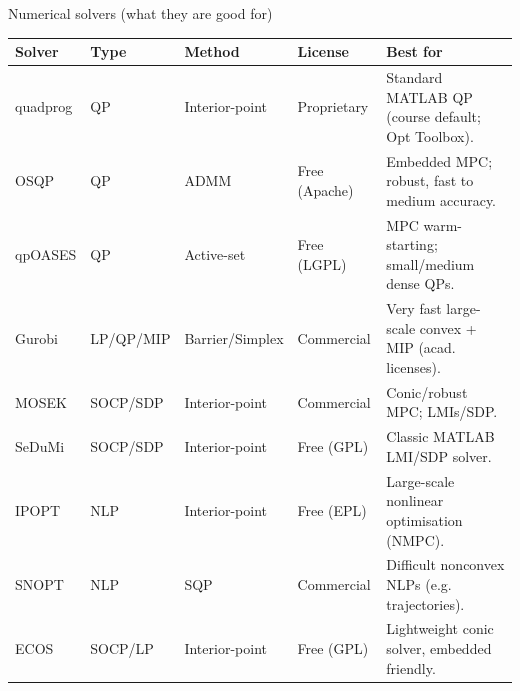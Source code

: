\documentclass[aspectratio=169,10pt]{beamer}
\begin{document}
\begin{frame}{Numerical solvers (what they are good for)}
\scriptsize
\begin{table}
\centering
\renewcommand{\arraystretch}{1.12}
\begin{tabularx}{\linewidth}{@{}l l l l X@{}}
\toprule
\textbf{Solver} & \textbf{Type} & \textbf{Method} & \textbf{License} & \textbf{Best for}\\
\midrule
quadprog & QP & Interior-point & Proprietary & Standard MATLAB QP (course default; Opt Toolbox).\\
OSQP & QP & ADMM & Free (Apache) & Embedded MPC; robust, fast to medium accuracy.\\
qpOASES & QP & Active-set & Free (LGPL) & MPC warm-starting; small/medium dense QPs.\\
Gurobi & LP/QP/MIP & Barrier/Simplex & Commercial & Very fast large-scale convex + MIP (acad. licenses).\\
MOSEK & SOCP/SDP & Interior-point & Commercial & Conic/robust MPC; LMIs/SDP.\\
SeDuMi & SOCP/SDP & Interior-point & Free (GPL) & Classic MATLAB LMI/SDP solver.\\
IPOPT & NLP & Interior-point & Free (EPL) & Large-scale nonlinear optimisation (NMPC).\\
SNOPT & NLP & SQP & Commercial & Difficult nonconvex NLPs (e.g. trajectories).\\
ECOS & SOCP/LP & Interior-point & Free (GPL) & Lightweight conic solver, embedded friendly.\\
\bottomrule
\end{tabularx}
\end{table}
\end{frame}
\end{document}
